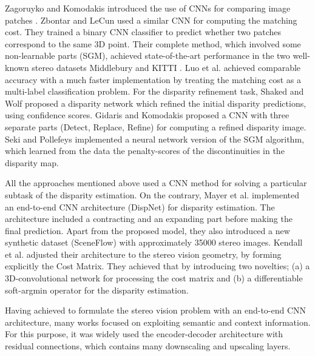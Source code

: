 \documentclass[runningheads]{llncs}
\begin{document}
Zagoruyko and Komodakis introduced the use of CNNs for comparing image patches \cite{zagoruyko2015learning}. Zbontar and LeCun \cite{Zbontar_2015_CVPR} used a similar CNN for computing the matching cost. They trained a binary CNN classifier to predict whether two patches correspond to the same 3D point. Their complete method, which involved some non-learnable parts (SGM), achieved state-of-the-art performance in the two well-known stereo datasets Middlebury \cite{Scharstein2014} and KITTI \cite{Menze2015ISA}. Luo et al. \cite{luo2016efficient} achieved comparable accuracy with a much faster implementation by treating the matching cost as a multi-label classification problem. For the disparity refinement task, Shaked and Wolf \cite{shaked2017improved} proposed a disparity network which refined the initial disparity predictions, using confidence scores. Gidaris and Komodakis \cite{Gidaris2017DetectLabeling} proposed a CNN with three separate parts (Detect, Replace, Refine) for computing a refined disparity image. Seki and Pollefeys implemented a neural network version of the SGM algorithm, which learned from the data the penalty-scores of the discontinuities in the disparity map. 

All the approaches mentioned above used a CNN method for solving a particular subtask of the disparity estimation. On the contrary, Mayer et al. \cite{Mayer2016ALD} implemented an end-to-end CNN architecture (DispNet) for disparity estimation. The architecture included a contracting and an expanding part before making the final prediction. Apart from the proposed model, they also introduced a new synthetic dataset (SceneFlow) with approximately 35000 stereo images. Kendall et al. \cite{Kendall2017End-to-EndRegression} adjusted their architecture to the stereo vision geometry, by forming explicitly the Cost Matrix. They achieved that by introducing two novelties; (a) a 3D-convolutional network for processing the cost matrix and (b) a differentiable soft-argmin operator for the disparity estimation. 

Having achieved to formulate the stereo vision problem with an end-to-end CNN architecture, many works focused on exploiting semantic and context information. For this purpose, it was widely used the encoder-decoder architecture with residual connections, which contains many downscaling and upscaling layers.
\end{document}
